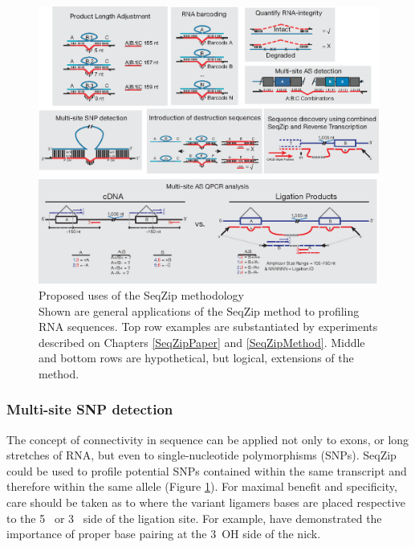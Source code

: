     \begin{figure} %
      \centering 
      \includegraphics{Figures/Discussion/SeqZipUses.eps}
      \caption[Proposed uses of the SeqZip methodology]
      {Proposed uses of the SeqZip methodology \\[0.25cm]
        Shown are general applications of the SeqZip method to profiling RNA sequences. Top row examples are substantiated by experiments described on Chapters \ref{SeqZipPaper} and \ref{SeqZipMethod}.  Middle and bottom rows are hypothetical, but logical, extensions of the method.
        }
      \label{Disc:fig: Panel of SeqZip Applications}
      \end{figure}

    \subsubsection{Multi-site SNP detection}
      \label{Disc:subsubsec: Multi-site SNP Detection}

      The concept of connectivity in sequence can be applied not only to exons, or long stretches of RNA, but even to single-nucleotide polymorphisms (SNPs). SeqZip could be used to profile potential SNPs contained within the same transcript and therefore within the same allele (Figure \ref{Disc:fig: Panel of SeqZip Applications}). For maximal benefit and specificity, care should be taken as to where the variant ligamers bases are placed respective to the 5\textprime~ or 3\textprime~ side of the ligation site. For example, \citet{Chauleau2013b} have demonstrated the importance of proper base pairing at the 3\textprime~OH side of the nick.


